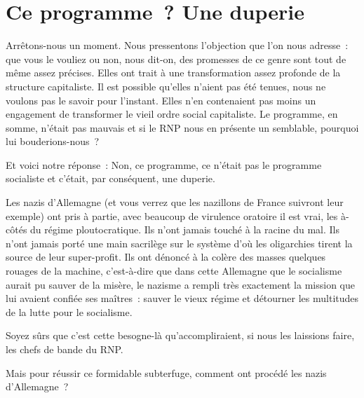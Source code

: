 \documentclass[french,twoside]{book} %
\begin{document}
\section[Ce programme ? Une duperie]{Ce programme ? Une duperie}
\noindent Arrêtons-nous un moment. Nous pressentons l’objection que l’on nous adresse : que vous le vouliez ou non, nous dit-on, des promesses de ce genre sont tout de même assez précises. Elles ont trait à une transformation assez profonde de la structure capitaliste. Il est possible qu’elles n’aient pas été tenues, nous ne voulons pas le savoir pour l’instant. Elles n’en contenaient pas moins un engagement de transformer le vieil ordre social capitaliste. Le programme, en somme, n’était pas mauvais et si le RNP nous en présente un semblable, pourquoi lui bouderions-nous ?\par
Et voici notre réponse : Non, ce programme, ce n’était pas le programme socialiste et c’était, par conséquent, une duperie.\par
Les nazis d’Allemagne (et vous verrez que les nazillons de France suivront leur exemple) ont pris à partie, avec beaucoup de virulence oratoire il est vrai, les à-côtés du régime ploutocratique. Ils n’ont jamais touché à la racine du mal. Ils n’ont jamais porté une main sacrilège sur le système d’où les oligarchies tirent la source de leur super-profit. Ils ont dénoncé à la colère des masses quelques rouages de la machine, c’est-à-dire que dans cette Allemagne que le socialisme aurait pu sauver de la misère, le nazisme a rempli très exactement la mission que lui avaient confiée ses maîtres : sauver le vieux régime et détourner les multitudes de la lutte pour le socialisme.\par
Soyez sûrs que c’est cette besogne-là qu’accompliraient, si nous les laissions faire, les chefs de bande du RNP.\par
Mais pour réussir ce formidable subterfuge, comment ont procédé les nazis d’Allemagne ?
\end{document}
